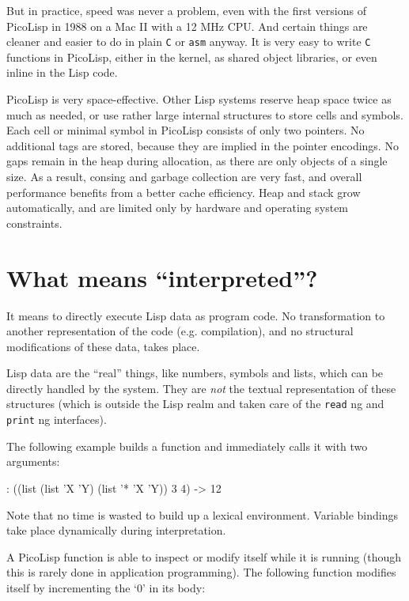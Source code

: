 But in practice, speed was never a problem, even with the first versions
of PicoLisp in 1988 on a Mac II with a 12 MHz CPU. And certain things
are cleaner and easier to do in plain \texttt{C} or \texttt{asm} anyway. It is very
easy to write \texttt{C} functions in PicoLisp, either in the kernel, as shared
object libraries, or even inline in the Lisp code.

PicoLisp is very space-effective. Other Lisp systems reserve heap space
twice as much as needed, or use rather large internal structures to
store cells and symbols. Each cell or minimal symbol in PicoLisp
consists of only two pointers. No additional tags are stored, because
they are implied in the pointer encodings. No gaps remain in the heap
during allocation, as there are only objects of a single size. As a
result, consing and garbage collection are very fast, and overall
performance benefits from a better cache efficiency. Heap and stack grow
automatically, and are limited only by hardware and operating system
constraints.

 
\section{What means ``interpreted''?}
\label{sec:faq-what-means-interpreted?}


It means to directly execute Lisp data as program code. No
transformation to another representation of the code (e.g. compilation),
and no structural modifications of these data, takes place.

Lisp data are the ``real'' things, like numbers, symbols and lists, which
can be directly handled by the system. They are \emph{not} the textual
representation of these structures (which is outside the Lisp realm and
taken care of the \texttt{read} ng and \texttt{print} ng interfaces).

The following example builds a function and immediately calls it with
two arguments:


\begin{wideverbatim}
: ((list (list 'X 'Y) (list '* 'X 'Y)) 3 4)
-> 12
\end{wideverbatim}

Note that no time is wasted to build up a lexical environment. Variable
bindings take place dynamically during interpretation.

A PicoLisp function is able to inspect or modify itself while it is
running (though this is rarely done in application programming). The
following function modifies itself by incrementing the `0' in its body:


